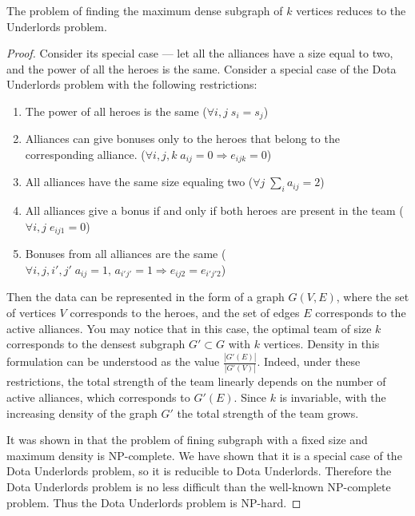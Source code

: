 \documentclass[smallextended]{svjour3}       %
\begin{document}
\begin{theorem}
\label{MEWC_DU}
The problem of finding the maximum dense subgraph of $k$ vertices reduces to the Underlords problem.
\end{theorem}
\begin{proof}

Consider its special case --- let all the alliances have a size equal to two, and the power of all the heroes is the same. Consider a special case of the Dota Underlords problem with the following restrictions:

\begin{enumerate}
    \item The power of all heroes is the same ($\forall i, j \; s_i=s_j$)
    \item Alliances can give bonuses only to the heroes that belong to the corresponding alliance. ($\forall i, j, k \; a_{ij}=0 \Longrightarrow e_{ijk} = 0$)
    
    \item All alliances have the same size equaling two ($\forall j \; \sum_i a_{ij}=2 $)
    \item All alliances give a bonus if and only if both heroes are present in the team ($\forall i, j \; e_{ij1}=0$)
    \item Bonuses from all alliances are the same ($\forall i, j, i', j' \; a_{ij}=1,\, a_{i' j'}=1 \Longrightarrow e_{ij2}=e_{i' j' 2}$)
\end{enumerate}

Then the data can be represented in the form of a graph $G(V, E) $, where the set of vertices $ V $ corresponds to the heroes, and the set of edges $E$ corresponds to the active alliances. You may notice that in this case, the optimal team of size $ k $ corresponds to the densest subgraph $ G' \subset G $ with $ k $ vertices. Density in this formulation can be understood as the value $ \frac{|G'(E)|}{|G'(V)|} $. Indeed, under these restrictions, the total strength of the team linearly depends on the number of active alliances, which corresponds to $ G'(E)$. Since $ k $ is invariable, with the increasing density of the graph $ G '$ the total strength of the team grows.

It was shown in \cite{downey1995fixed} that the problem of fining subgraph with a fixed size and maximum density is NP-complete. We have shown that it is a special case of the Dota Underlords problem, so it is reducible to Dota Underlords. Therefore the Dota Underlords problem is no less difficult than the well-known NP-complete problem. Thus the Dota Underlords problem is NP-hard.

\end{proof}
\end{document}

